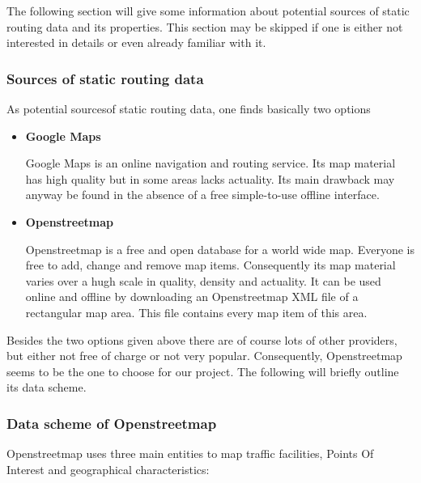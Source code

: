The following section will give some information about potential sources of static routing data and its properties. This section may be skipped if one is either not interested in details or even already familiar with it.

\subsubsection{Sources of static routing data}
 
As potential sourcesof static routing data, one finds basically two options

\begin{itemize}
 
	\item \textbf{Google Maps}
	
		Google Maps is an online navigation and routing service. Its map material has high quality but in some areas lacks actuality. Its main drawback may anyway be found in the absence of a free simple-to-use offline interface. 
	
	\item \textbf{Openstreetmap}
	
		Openstreetmap is a free and open database for a world wide map. Everyone is free to add, change and remove map items. Consequently its map material varies over a hugh scale in quality, density and actuality. It can be used online and offline by downloading an Openstreetmap XML file of a rectangular map area. This file contains every map item of this area.
  
\end{itemize} 

Besides the two options given above there are of course lots of other providers, but either not free of charge or not very popular. Consequently, Openstreetmap seems to be the one to choose for our project. The following will briefly outline its data scheme.

\subsubsection{Data scheme of Openstreetmap}

Openstreetmap uses three main entities to map traffic facilities, Points Of Interest and geographical characteristics:

